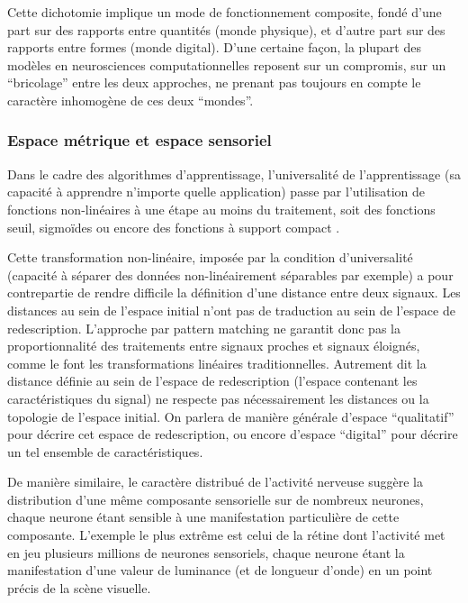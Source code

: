 \documentclass[11pt]{article}
\begin{document}
Cette dichotomie  implique un mode de fonctionnement composite, fondé d'une part sur des rapports entre quantités (monde physique), 
et d'autre part sur des rapports entre formes (monde digital).
D'une certaine façon, la plupart des modèles en neurosciences computationnelles 
reposent sur un compromis, sur un ``bricolage'' entre les deux approches, ne prenant pas 
toujours en compte le caractère inhomogène de ces deux ``mondes''.

	\subsubsection{Espace métrique et espace sensoriel}	


 Dans le cadre des algorithmes d'apprentissage, l'universalité de l'apprentissage (sa capacité à
	apprendre n'importe quelle application) passe par l'utilisation de fonctions non-linéaires 
	à une étape au moins du traitement, soit des fonctions seuil, sigmoïdes ou encore des
	fonctions à support compact . 
	
	Cette transformation non-linéaire, imposée par la condition d'universalité (capacité à séparer des données 
	non-linéairement séparables par exemple) a pour contrepartie de rendre difficile la définition
	d'une distance entre deux signaux. 
	Les distances au sein de l'espace initial n'ont pas de traduction au sein de
	l'espace de redescription.
	L'approche par pattern matching ne garantit donc pas la proportionnalité des traitements entre signaux proches 
	et signaux éloignés, comme le font les transformations linéaires  traditionnelles.
	Autrement dit la distance définie au sein de l'espace de redescription (l'espace contenant les caractéristiques du signal)
	ne respecte pas nécessairement les distances ou la topologie de l'espace initial.
	On parlera de manière générale d'espace ``qualitatif'' pour décrire cet espace de redescription, ou encore d'espace
	``digital'' pour décrire un tel ensemble de caractéristiques.
	
De manière similaire, le caractère distribué de l'activité nerveuse suggère  la distribution d'une même composante sensorielle 
	sur de nombreux neurones, chaque neurone étant sensible à une manifestation particulière
	de cette composante. L'exemple le plus extrême est celui de la rétine dont l'activité met en jeu 
	plusieurs millions de neurones sensoriels, chaque neurone étant la manifestation d'une valeur de luminance
	(et de longueur d'onde) en un point précis de la scène visuelle.
\end{document}
